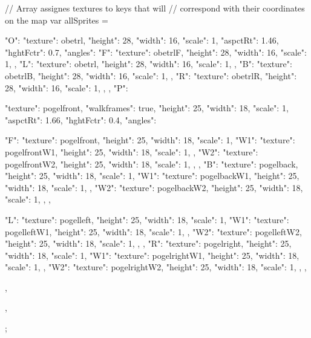// Array assignes textures to keys that will
// correspond with their coordinates on the map
var allSprites = {
  "O": {
    "texture": obetrl,
    "height": 28,
    "width": 16,
    "scale": 1,
    "aspctRt": 1.46,
    "hghtFctr": 0.7,
    "angles":{
      "F": {
        "texture": obetrlF,
        "height": 28,
        "width": 16,
        "scale": 1,
      },
      "L": {
        "texture": obetrl,
        "height": 28,
        "width": 16,
        "scale": 1,
      },
      "B": {
        "texture": obetrlB,
        "height": 28,
        "width": 16,
        "scale": 1,
      },
      "R": {
        "texture": obetrlR,
        "height": 28,
        "width": 16,
        "scale": 1,
      },
    }
  },
  "P": {
    "texture": pogelfront,
    "walkframes": true,
    "height": 25,
    "width": 18,
    "scale": 1,
    "aspctRt": 1.66,
    "hghtFctr": 0.4,
    "angles":{
      "F": {
        "texture": pogelfront,
        "height": 25,
        "width": 18,
        "scale": 1,
        "W1": {
          "texture": pogelfrontW1,
          "height": 25,
          "width": 18,
          "scale": 1,
        },
        "W2": {
          "texture": pogelfrontW2,
          "height": 25,
          "width": 18,
          "scale": 1,
        },
      },
      "B": {
        "texture": pogelback,
        "height": 25,
        "width": 18,
        "scale": 1,
        "W1": {
          "texture": pogelbackW1,
          "height": 25,
          "width": 18,
          "scale": 1,
        },
        "W2": {
          "texture": pogelbackW2,
          "height": 25,
          "width": 18,
          "scale": 1,
        },
      },

      "L": {
        "texture": pogelleft,
        "height": 25,
        "width": 18,
        "scale": 1,
        "W1": {
          "texture": pogelleftW1,
          "height": 25,
          "width": 18,
          "scale": 1,
        },
        "W2": {
          "texture": pogelleftW2,
          "height": 25,
          "width": 18,
          "scale": 1,
        },
      },
      "R": {
        "texture": pogelright,
        "height": 25,
        "width": 18,
        "scale": 1,
        "W1": {
          "texture": pogelrightW1,
          "height": 25,
          "width": 18,
          "scale": 1,
        },
        "W2": {
          "texture": pogelrightW2,
          "height": 25,
          "width": 18,
          "scale": 1,
        },
      },
    },
  },
};

